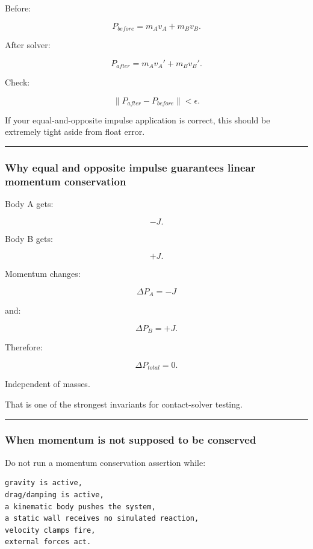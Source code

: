 Before:

\[
P_{before}
=
m_Av_A+
m_Bv_B.
\]

After solver:

\[
P_{after}
=
m_Av_A'+
m_Bv_B'.
\]

Check:

\[
\boxed{
\|P_{after}-P_{before}\|
<
\epsilon.
}
\]

If your equal-and-opposite impulse application is correct, this should be extremely tight aside from float error.

\begin{center}\rule{0.5\linewidth}{0.5pt}\end{center}

\subsubsection{Why equal and opposite impulse guarantees linear momentum conservation}\label{why-equal-and-opposite-impulse-guarantees-linear-momentum-conservation}

Body A gets:

\[
-J.
\]

Body B gets:

\[
+J.
\]

Momentum changes:

\[
\Delta P_A=-J
\]

and:

\[
\Delta P_B=+J.
\]

Therefore:

\[
\Delta P_{total}=0.
\]

Independent of masses.

That is one of the strongest invariants for contact-solver testing.

\begin{center}\rule{0.5\linewidth}{0.5pt}\end{center}

\subsubsection{When momentum is not supposed to be conserved}\label{when-momentum-is-not-supposed-to-be-conserved}

Do not run a momentum conservation assertion while:

\begin{verbatim}
gravity is active,
drag/damping is active,
a kinematic body pushes the system,
a static wall receives no simulated reaction,
velocity clamps fire,
external forces act.
\end{verbatim}


